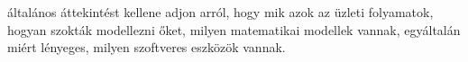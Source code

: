 
általános áttekintést kellene adjon arról, hogy mik azok az üzleti folyamatok, hogyan szokták modellezni őket, milyen matematikai modellek vannak, egyáltalán miért lényeges, milyen szoftveres eszközök vannak.